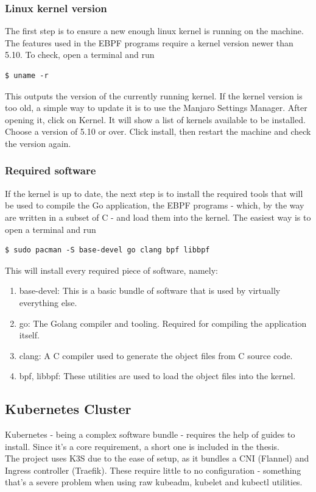\subsubsection{Linux kernel version}
The first step is to ensure a new enough linux kernel is running on the machine. The features used in the EBPF programs require a kernel version newer than 5.10. To check, open a terminal and run
\begin{verbatim}
$ uname -r 
\end{verbatim}
This outputs the version of the currently running kernel. If the kernel version is too old, a simple way to update it is to use the Manjaro Settings Manager. After opening it, click on Kernel. It will show a list of kernels available to be installed. Choose a version of 5.10 or over. Click install, then restart the machine and check the version again.

\subsubsection{Required software}
If the kernel is up to date, the next step is to install the required tools that will be used to compile the Go application, the EBPF programs - which, by the way are written in a subset of C - and load them into the kernel. The easiest way is to open a terminal and run
\begin{verbatim}
$ sudo pacman -S base-devel go clang bpf libbpf
\end{verbatim}
\noindent
This will install every required piece of software, namely:
\begin{enumerate}
    \item base-devel: This is a basic bundle of software that is used by virtually everything else.
    \item go: The Golang compiler and tooling. Required for compiling the application itself.
    \item clang: A C compiler used to generate the object files from C source code.
    \item bpf, libbpf: These utilities are used to load the object files into the kernel.
\end{enumerate}


\subsection{Kubernetes Cluster}
Kubernetes - being a complex software bundle - requires the help of guides to install. Since it's a core requirement, a short one is included in the thesis.\\
The project uses K3S due to the ease of setup, as it bundles a CNI (Flannel) and Ingress controller (Traefik). These require little to no configuration - something that's a severe problem when using raw kubeadm, kubelet and kubectl utilities.

